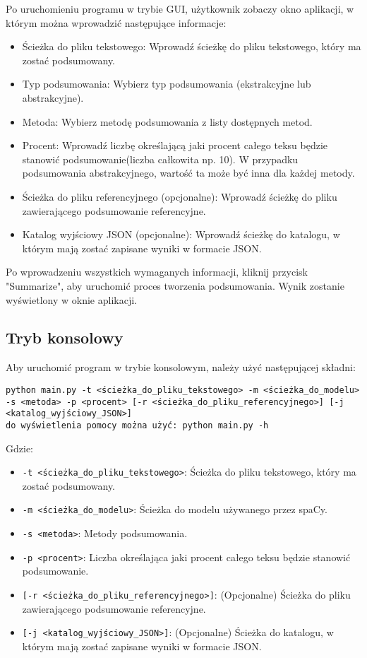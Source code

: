 \documentclass{article}
\begin{document}
Po uruchomieniu programu w trybie GUI, użytkownik zobaczy okno aplikacji, w którym można wprowadzić następujące informacje:
\begin{itemize}
    \item Ścieżka do pliku tekstowego: Wprowadź ścieżkę do pliku tekstowego, który ma zostać podsumowany.
    \item Typ podsumowania: Wybierz typ podsumowania (ekstrakcyjne lub abstrakcyjne).
    \item Metoda: Wybierz metodę podsumowania z listy dostępnych metod.
    \item Procent: Wprowadź liczbę określającą jaki procent całego teksu będzie stanowić podsumowanie(liczba całkowita np. 10). W przypadku podsumowania abstrakcyjnego, wartość ta może być inna dla każdej metody.
    \item Ścieżka do pliku referencyjnego (opcjonalne): Wprowadź ścieżkę do pliku zawierającego podsumowanie referencyjne.
    \item Katalog wyjściowy JSON (opcjonalne): Wprowadź ścieżkę do katalogu, w którym mają zostać zapisane wyniki w formacie JSON.
\end{itemize}

Po wprowadzeniu wszystkich wymaganych informacji, kliknij przycisk "Summarize", aby uruchomić proces tworzenia podsumowania. Wynik zostanie wyświetlony w oknie aplikacji.

\subsection{Tryb konsolowy}
Aby uruchomić program w trybie konsolowym, należy użyć następującej składni:
\begin{verbatim}
python main.py -t <ścieżka_do_pliku_tekstowego> -m <ścieżka_do_modelu> -s <metoda> -p <procent> [-r <ścieżka_do_pliku_referencyjnego>] [-j <katalog_wyjściowy_JSON>]
do wyświetlenia pomocy można użyć: python main.py -h
\end{verbatim}

Gdzie:
\begin{itemize}
    \item \texttt{-t <ścieżka\_do\_pliku\_tekstowego>}: Ścieżka do pliku tekstowego, który ma zostać podsumowany.
    \item \texttt{-m <ścieżka\_do\_modelu>}: Ścieżka do modelu używanego przez spaCy.
    \item \texttt{-s <metoda>}: Metody podsumowania.
    \item \texttt{-p <procent>}: Liczba określająca jaki procent całego teksu będzie stanowić podsumowanie.
    \item \texttt{[-r <ścieżka\_do\_pliku\_referencyjnego>]}: (Opcjonalne) Ścieżka do pliku zawierającego podsumowanie referencyjne.
    \item \texttt{[-j <katalog\_wyjściowy\_JSON>]}: (Opcjonalne) Ścieżka do katalogu, w którym mają zostać zapisane wyniki w formacie JSON.
\end{itemize}
\end{document}
